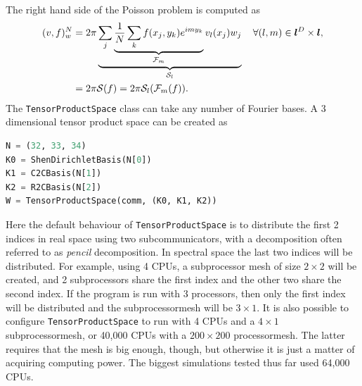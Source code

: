 \documentclass[%
oneside,                 %
final,                   %
10pt]{article}
\begin{document}
The right hand side of the Poisson problem is computed as
\begin{align}
(v, f)_w^N &= 2\pi \underbrace{\sum_{j}\underbrace{\frac{1}{N} \sum_{k} f(x_j, y_k) e^{imy_k} }_{\mathcal{F}_m} v_l(x_j)   w_j}_{\mathcal{S}_l} \quad \forall (l, m) \in \boldsymbol{l}^D \times \boldsymbol{l}, \notag \\
  &= 2\pi \mathcal{S}(f) = 2 \pi \mathcal{S}_l(\mathcal{F}_m(f)).
\end{align}
The \texttt{TensorProductSpace} class can take any number of Fourier bases. A 3 dimensional tensor product space can be created as
\begin{lstlisting}[language=Python,style=yellow2_fb]
N = (32, 33, 34)
K0 = ShenDirichletBasis(N[0])
K1 = C2CBasis(N[1])
K2 = R2CBasis(N[2])
W = TensorProductSpace(comm, (K0, K1, K2))
\end{lstlisting}
Here the default behaviour of \texttt{TensorProductSpace} is to distribute the first 2 indices in real space using two subcommunicators, with a decomposition often referred to as \emph{pencil} decomposition. In spectral space the last two indices will be distributed. For example, using 4 CPUs, a subprocessor mesh of size $2 \times 2$ will be created, and 2 subprocessors share the first index and the other two share the second index.  If the program is run with 3 processors, then only the first index will be distributed and the subprocessormesh will be $3 \times 1$. It is also possible to configure \texttt{TensorProductSpace} to run with 4 CPUs and a $4 \times 1$ subprocessormesh, or 40,000 CPUs with a $200 \times 200$ processormesh. The latter requires that the mesh is big enough, though, but otherwise it is just a matter of acquiring computing power. The biggest simulations tested thus far used 64,000 CPUs. 
\end{document}
